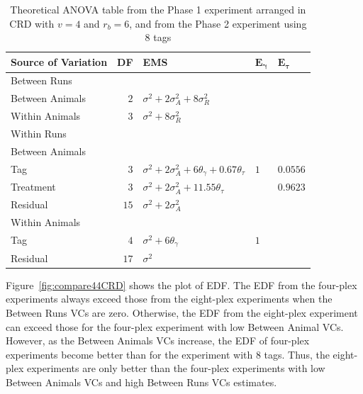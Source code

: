 \documentclass[12pt,a4paper]{article}
\begin{document}
\begin{table}[ht]
\centering
 \caption{Theoretical ANOVA table from the Phase 1 experiment arranged in CRD with $v = 4$ and $r_b = 6$, and from the Phase 2 experiment using 8 tags}
 \begin{tabular}[t]{lrlll} 
 \toprule 
 \multicolumn{1}{l}{\textbf{Source of Variation}} & \multicolumn{1}{l}{\textbf{DF}} & \multicolumn{1}{l}{\textbf{EMS}}& \multicolumn{1}{l}{$\bm{E_{\gamma}}$}&\multicolumn{1}{l}{$\bm{E_{\tau}}$}\\ 
 \midrule 
 Between Runs &  &  & & \\ 
 \quad Between Animals & $2$ & $\sigma^2+2\sigma_{A}^2+8\sigma_{R}^2$ & & \\  \quad Within Animals & $3$ & $\sigma^2+8\sigma_{R}^2$ & & \\ \hline 
 Within Runs &  &  & & \\ 
 \quad Between Animals &  &  & & \\ 
 \quad \quad Tag & $3$ & $\sigma^2+2\sigma_{A}^2+6\theta_{\gamma}+ 0.67\theta_{\tau}$ &$1$ & $0.0556$\\ 
 \quad \quad Treatment & $3$ & $\sigma^2+2\sigma_{A}^2+11.55\theta_{\tau}$ & & $0.9623$\\ 
 \quad \quad Residual & $15$ & $\sigma^2+2\sigma_{A}^2$ & & \\ \hline 
 \quad Within Animals &  &  & & \\ 
 \quad \quad Tag & $4$ & $\sigma^2+6\theta_{\gamma}$ &$1$ & \\ 
 \quad \quad Residual & $17$ & $\sigma^2$ & & \\ 
 \bottomrule 
 \end{tabular} 
 \label{tab:ANOVAPhase1CRD22} 
\end{table} 

Figure~\ref{fig:compare44CRD} shows the plot of EDF. The EDF from the four-plex experiments always exceed those from the eight-plex experiments when the Between Runs VCs are zero. Otherwise, the EDF from the eight-plex experiment can exceed those for the four-plex experiment with low Between Animal VCs. However, as the Between Animals VCs increase, the EDF of four-plex experiments become better than for the experiment with 8 tags. Thus, the eight-plex experiments are only better than the four-plex experiments with low Between Animals VCs and high Between Runs VCs estimates.
\end{document}
